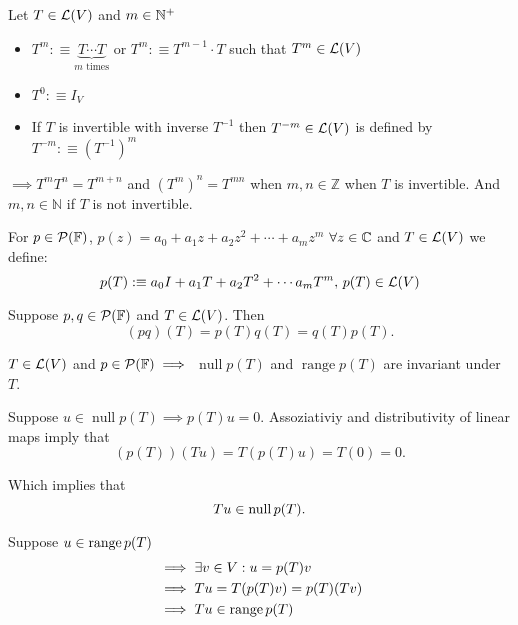 \setcounter{thm}{12}
\begin{mydef}
  Let $T \in \mathcal{L}(V)$ and $m\in \mathbb{N}^{+}$
  \begin{itemize}
    \item $T^{m} :\equiv \underbrace{T \cdots T}_{\text{$m$ times}}$ or $T^{m} :\equiv T^{m-1} \cdot T$ such that $T^{m} \in \mathcal{L}(V)$
    \item $T^0 :\equiv I_V$
    \item If $T$ is invertible with inverse $T^{-1}$ then $T^{-m}\in \mathcal{L}(V)$ is defined by $T^{-m} :\equiv (T^{-1})^m$
  \end{itemize}
\end{mydef}
$\implies T^m T^n = T^{m+n}$ and $(T^m)^n=T^{mn}$ when $m,n \in \mathbb{Z}$ when $T$ is invertible. And $m,n \in \mathbb{N}$ if $T$ is not invertible.

\begin{mydef}
  For $p \in \mathcal{P} (\mathbb{F})$, $p(z) = a_0+a_1z+a_2z^2+\cdots+a_mz^m$
  $\forall z \in \mathbb{C}$ and
  $T \in \mathcal{L} (V)$ we define: \\
  \begin{equation}
    p(T) :\equiv a_0 I + a_1 T + a_2 T^2 + \cdots a_m T^m,$ $p(T) \in \linmap(V)
  \end{equation}
\end{mydef}



\setcounter{thm}{16}
\begin{thm}
  \label{multiplicative-properties}
  Suppose $p,q \in \mathcal{P} (\mathbb{F})$ and $T\in \mathcal{L} (V)$. Then \begin{equation}
    (p q)(T) = p(T) q(T) = q(T)p(T).
  \end{equation}
\end{thm}

\begin{thm}
  \label{null-space-and-range-of-p(T)-are-invariant-under-T}
  $T \in \mathcal{L}(V)$ and $p\in \mathcal{P} (\mathbb{F}) \implies$
  $\operatorname{null} p(T)$ and $\operatorname{range} p(T)$ are invariant under $T$.
\end{thm}
\begin{prf}
  Suppose $u\in \operatorname{null} p(T) \implies p(T)u = 0$. Assoziativiy and distributivity of linear maps imply that 
  \begin{equation}
    (p(T))(Tu)=T(p(T)u)=T(0)=0.
  \end{equation}
  
  Which implies that
  \begin{equation}
    Tu \in \operatorname{null} p(T).
  \end{equation}

  Suppose $u \in \operatorname{range} p(T)$
  \begin{equation}
    \begin{aligned}
    &\implies \exists v\in V: u=p(T)v \\
    &\implies Tu=T(p(T)v)=p(T)(Tv) \\
    &\implies Tu \in \operatorname{range} p(T)
    \end{aligned}
  \end{equation}
\end{prf}

